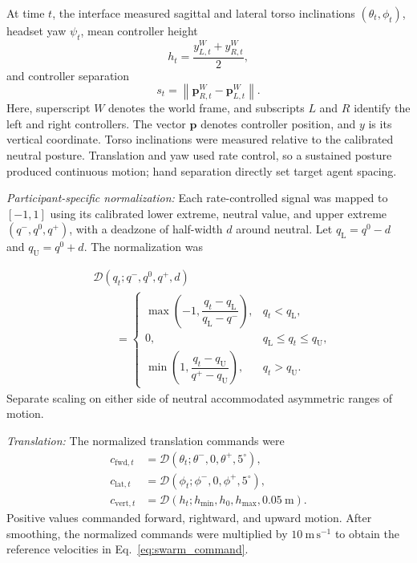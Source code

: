 \documentclass[a4paper,10pt,conference]{ieeeconf}
\begin{document}
At time $t$, the interface measured sagittal and lateral torso
inclinations $(\theta_t,\phi_t)$, headset yaw $\psi_t$, mean
controller height
\[
h_t=\frac{y^W_{L,t}+y^W_{R,t}}{2},
\]
and controller separation
\[
s_t=\left\lVert\mathbf{p}^W_{R,t}-\mathbf{p}^W_{L,t}\right\rVert.
\]
Here, superscript $W$ denotes the world frame, and subscripts
$L$ and $R$ identify the left and right controllers.
The vector $\mathbf{p}$ denotes controller position, and $y$
is its vertical coordinate. Torso inclinations were measured
relative to the calibrated neutral posture.
Translation and yaw used rate control, so a sustained posture produced
continuous motion; hand separation directly set target agent spacing.

\emph{Participant-specific normalization:}
Each rate-controlled signal was mapped to $[-1,1]$ using its calibrated lower
extreme, neutral value, and upper extreme $(q^{-},q^{0},q^{+})$, with a
deadzone of half-width $d$ around neutral. Let
$q_{\mathrm{L}}=q^{0}-d$ and $q_{\mathrm{U}}=q^{0}+d$. The normalization was

\begin{equation}
\begin{split}
&\mathcal{D}(q_t;q^{-},q^{0},q^{+},d)\\
&\qquad=
\begin{cases}
\max\!\left(-1,\dfrac{q_t-q_{\mathrm{L}}}{q_{\mathrm{L}}-q^{-}}\right),
& q_t<q_{\mathrm{L}},\\[8pt]
0,
& q_{\mathrm{L}}\leq q_t\leq q_{\mathrm{U}},\\[8pt]
\min\!\left(1,\dfrac{q_t-q_{\mathrm{U}}}{q^{+}-q_{\mathrm{U}}}\right),
& q_t>q_{\mathrm{U}}.
\end{cases}
\end{split}
\label{eq:deadzone_mapping}
\end{equation}
Separate scaling on either side of neutral accommodated asymmetric ranges of
motion.

\emph{Translation:}
The normalized translation commands were
\begin{align}
c_{\mathrm{fwd},t}
&=\mathcal{D}(\theta_t;\theta^{-},0,\theta^{+},5^{\circ}),
\nonumber\\
c_{\mathrm{lat},t}
&=\mathcal{D}(\phi_t;\phi^{-},0,\phi^{+},5^{\circ}),
\nonumber\\
c_{\mathrm{vert},t}
&=\mathcal{D}(h_t;h_{\min},h_0,h_{\max},0.05~\mathrm{m}).
\label{eq:body_rate_commands}
\end{align}
Positive values commanded forward, rightward, and upward motion. After
smoothing, the normalized commands were multiplied by
$10~\mathrm{m\,s^{-1}}$ to obtain the reference velocities in
Eq.~\eqref{eq:swarm_command}.
\end{document}
